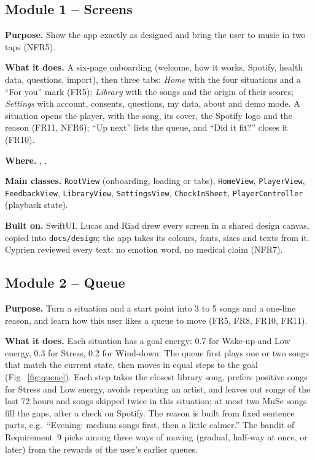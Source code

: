 \documentclass[conference]{IEEEtran}
\newcommand{\field}[1]{\noindent\textbf{#1}}
\begin{document}
\subsection{Module 1 -- Screens}
\field{Purpose.} Show the app exactly as designed and bring the user to music in two taps (NFR5).

\field{What it does.} A six-page onboarding (welcome, how it works, Spotify, health data, questions, import), then three tabs: \emph{Home} with the four situations and a ``For you'' mark (FR5); \emph{Library} with the songs and the origin of their scores; \emph{Settings} with account, consents, questions, my data, about and demo mode. A situation opens the player, with the song, its cover, the Spotify logo and the reason (FR11, NFR6); ``Up next'' lists the queue, and ``Did it fit?'' closes it (FR10).

\field{Where.} , .

\field{Main classes.} \texttt{RootView} (onboarding, loading or tabs), \texttt{HomeView}, \texttt{PlayerView}, \texttt{FeedbackView}, \texttt{LibraryView}, \texttt{SettingsView}, \texttt{CheckInSheet}, \texttt{PlayerController} (playback state).

\field{Built on.} SwiftUI. Lucas and Riad drew every screen in a shared design canvas, copied into \texttt{docs/design}; the app takes its colours, fonts, sizes and texts from it. Cyprien reviewed every text: no emotion word, no medical claim (NFR7).

\subsection{Module 2 -- Queue}
\field{Purpose.} Turn a situation and a start point into 3 to 5 songs and a one-line reason, and learn how this user likes a queue to move (FR5, FR8, FR10, FR11).

\field{What it does.} Each situation has a goal energy: 0.7 for Wake-up and Low energy, 0.3 for Stress, 0.2 for Wind-down. The queue first plays one or two songs that match the current state, then moves in equal steps to the goal (Fig.~\ref{fig:queue}). Each step takes the closest library song, prefers positive songs for Stress and Low energy, avoids repeating an artist, and leaves out songs of the last 72 hours and songs skipped twice in this situation; at most two MuSe songs fill the gaps, after a check on Spotify. The reason is built from fixed sentence parts, e.g.\ ``Evening: medium songs first, then a little calmer.'' The bandit of Requirement~9 picks among three ways of moving (gradual, half-way at once, or later) from the rewards of the user's earlier queues.
\end{document}
